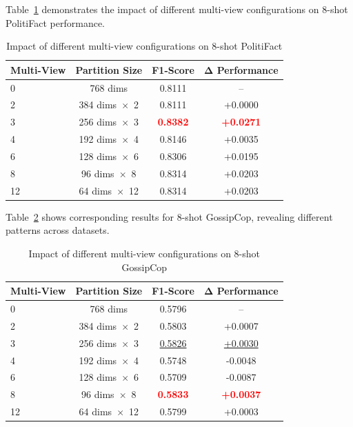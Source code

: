 Table~\ref{tab:hyperparameter_multi_view_politifact} demonstrates the impact of different multi-view configurations on 8-shot PolitiFact performance.

\begin{table}[htbp]
\centering
\caption{Impact of different multi-view configurations on 8-shot PolitiFact}
\label{tab:hyperparameter_multi_view_politifact}
\begin{tabular}{lccc}
\toprule
\textbf{Multi-View} & \textbf{Partition Size} & \textbf{F1-Score} & \textbf{Δ Performance} \\
\midrule
0  & 768 dims & 0.8111 & -- \\
2  & 384 dims~$\times$~2 & 0.8111 & +0.0000 \\
3  & 256 dims~$\times$~3 & \textcolor{red}{\textbf{0.8382}} & \textcolor{red}{\textbf{+0.0271}} \\
4  & 192 dims~$\times$~4 & 0.8146 & +0.0035 \\
6  & 128 dims~$\times$~6 & 0.8306 & +0.0195 \\
8  & 96 dims~$\times$~8  & 0.8314 & +0.0203 \\ 
12 & 64 dims~$\times$~12 & 0.8314 & +0.0203 \\
\bottomrule
\end{tabular}
\end{table}
    

Table~\ref{tab:hyperparameter_multi_view_gossipcop} shows corresponding results for 8-shot GossipCop, revealing different patterns across datasets.

\begin{table}[htbp]
\centering
\caption{Impact of different multi-view configurations on 8-shot GossipCop}
\label{tab:hyperparameter_multi_view_gossipcop}
\begin{tabular}{lccc}
\toprule
\textbf{Multi-View} & \textbf{Partition Size} & \textbf{F1-Score} & \textbf{Δ Performance} \\
\midrule
0  & 768 dims & 0.5796 & -- \\
2  & 384 dims~$\times$~2 & 0.5803 & +0.0007 \\
3  & 256 dims~$\times$~3 & \underline{0.5826} & \underline{+0.0030} \\
4  & 192 dims~$\times$~4 & 0.5748 & -0.0048 \\
6  & 128 dims~$\times$~6 & 0.5709 & -0.0087 \\
8  & 96 dims~$\times$~8  & \textcolor{red}{\textbf{0.5833}} & \textcolor{red}{\textbf{+0.0037}} \\ 
12 & 64 dims~$\times$~12 & 0.5799 & +0.0003 \\
\bottomrule
\end{tabular}
\end{table}
    

